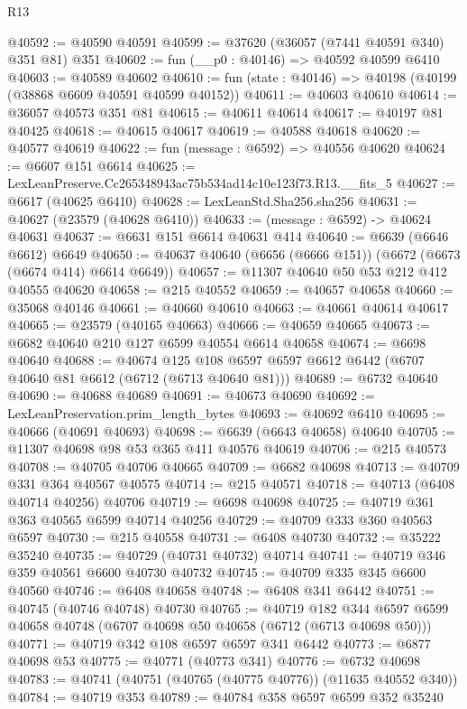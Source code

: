 \begin{lexlean}{R13}
\begin{coremodule}
@40592 := @40590 @40591
@40599 := @37620 (@36057 (@7441 @40591 @340) @351 @81) @351
@40602 := fun (__p0 : @40146) => @40592 @40599 @6410
@40603 := @40589 @40602
@40610 := fun (state : @40146) => @40198 (@40199 (@38868 @6609 @40591 @40599 @40152))
@40611 := @40603 @40610
@40614 := @36057 @40573 @351 @81
@40615 := @40611 @40614
@40617 := @40197 @81 @40425
@40618 := @40615 @40617
@40619 := @40588 @40618
@40620 := @40577 @40619
@40622 := fun (message : @6592) => @40556 @40620
@40624 := @6607 @151 @6614
@40625 := LexLeanPreserve.Cc265348943ac75b534ad14c10e123f73.R13.__fits_5
@40627 := @6617 (@40625 @6410)
@40628 := LexLeanStd.Sha256.sha256
@40631 := @40627 (@23579 (@40628 @6410))
@40633 := (message : @6592) -> @40624 @40631
@40637 := @6631 @151 @6614 @40631 @414
@40640 := @6639 (@6646 @6612) @6649
@40650 := @40637 @40640 (@6656 (@6666 @151)) (@6672 (@6673 (@6674 @414) @6614 @6649))
@40657 := @11307 @40640 @50 @53 @212 @412 @40555 @40620
@40658 := @215 @40552
@40659 := @40657 @40658
@40660 := @35068 @40146
@40661 := @40660 @40610
@40663 := @40661 @40614 @40617
@40665 := @23579 (@40165 @40663)
@40666 := @40659 @40665
@40673 := @6682 @40640 @210 @127 @6599 @40554 @6614 @40658
@40674 := @6698 @40640
@40688 := @40674
    @125
    @108
    @6597
    @6597
    @6612
    @6442
    (@6707 @40640 @81 @6612 (@6712 (@6713 @40640 @81)))
@40689 := @6732 @40640
@40690 := @40688 @40689
@40691 := @40673 @40690
@40692 := LexLeanPreservation.prim_length_bytes
@40693 := @40692 @6410
@40695 := @40666 (@40691 @40693)
@40698 := @6639 (@6643 @40658) @40640
@40705 := @11307 @40698 @98 @53 @365 @411 @40576 @40619
@40706 := @215 @40573
@40708 := @40705 @40706 @40665
@40709 := @6682 @40698
@40713 := @40709 @331 @364 @40567 @40575
@40714 := @215 @40571
@40718 := @40713 (@6408 @40714 @40256) @40706
@40719 := @6698 @40698
@40725 := @40719 @361 @363 @40565 @6599 @40714 @40256
@40729 := @40709 @333 @360 @40563 @6597
@40730 := @215 @40558
@40731 := @6408 @40730
@40732 := @35222 @35240
@40735 := @40729 (@40731 @40732) @40714
@40741 := @40719 @346 @359 @40561 @6600 @40730 @40732
@40745 := @40709 @335 @345 @6600 @40560
@40746 := @6408 @40658
@40748 := @6408 @341 @6442
@40751 := @40745 (@40746 @40748) @40730
@40765 := @40719
    @182
    @344
    @6597
    @6599
    @40658
    @40748
    (@6707 @40698 @50 @40658 (@6712 (@6713 @40698 @50)))
@40771 := @40719 @342 @108 @6597 @6597 @341 @6442
@40773 := @6877 @40698 @53
@40775 := @40771 (@40773 @341)
@40776 := @6732 @40698
@40783 := @40741 (@40751 (@40765 (@40775 @40776)) (@11635 @40552 @340))
@40784 := @40719 @353
@40789 := @40784 @358 @6597 @6599 @352 @35240

\end{coremodule}
\end{lexlean}

